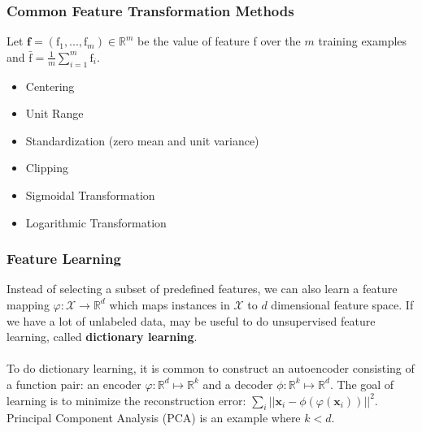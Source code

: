 \documentclass{article}
\begin{document}
   \subsubsection{Common Feature Transformation Methods}
   Let $\textbf{f} = (\text{f}_1,...,\text{f}_m) \in \mathbb{R}^m$ be the value of feature f over the $m$ training examples and $\bar{\text{f}} = \frac{1}{m} \sum_{i=1}^m \text{f}_i$.
   \begin{itemize}
   \item Centering
   \item Unit Range
   \item Standardization (zero mean and unit variance)
   \item Clipping
   \item Sigmoidal Transformation
   \item Logarithmic Transformation
   \end{itemize}
   
   \subsubsection{Feature Learning}
   Instead of selecting a subset of predefined features, we can also learn a feature mapping $\varphi : \mathcal{X} \rightarrow \mathbb{R}^d$ which maps instances in $\mathcal{X}$ to $d$ dimensional feature space. If we have a lot of unlabeled data, may be useful to do unsupervised feature learning, called \textbf{dictionary learning}. 
   \\\\
   To do dictionary learning, it is common to construct an autoencoder consisting of a function pair: an encoder $\varphi: \mathbb{R}^d \mapsto \mathbb{R}^k$ and  a decoder $\phi: \mathbb{R}^k \mapsto \mathbb{R}^d$. The goal of learning is to minimize the reconstruction error: $\sum_i || \textbf{x}_i - \phi(\varphi(\textbf{x}_i)) ||^2$. Principal Component Analysis (PCA) is an example where $k < d$.
   
   \clearpage
\end{document}
